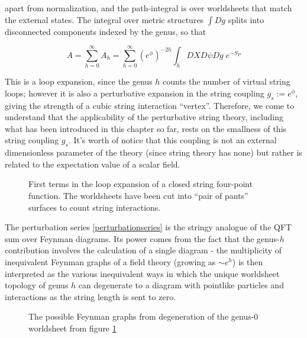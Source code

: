 apart from normalization, and the path-integral is over worldsheets that match the external states. The integral over metric structures $\int Dg$ splits into disconnected components indexed by the genus, so that

\begin{equation}
	A = \sum_{h=0}^{\infty} A_h = \sum_{h=0}^\infty (e^\phi)^{-2h} \int_h DX D\psi Dg \; e^{-S_P}
	\label{perturbationseries}
\end{equation}

This is a loop expansion, since the genus $h$ counts the number of virtual string loops; however it is also a perturbative expansion in the string coupling $g_s := e^\phi$, giving the strength of a cubic string interaction ``vertex''. Therefore, we come to understand that the applicability of the perturbative string theory, including what has been introduced in this chapter so far, rests on the smallness of this string coupling $g_s$. It's worth of notice that this coupling is not an external dimensionless parameter of the theory (since string theory has none) but rather is related to the expectation value of a scalar field.

\begin{figure}[h!]
\centering
\def\svgwidth{300pt}
\captionsetup{width=0.8\textwidth}

\caption{First terms in the loop expansion of a closed string four-point function. The worldsheets have been cut into ``pair of pants'' surfaces to count string interactions.} \label{loopfigure}
\end{figure}


The perturbation series \eqref{perturbationseries} is the stringy analogue of the QFT sum over Feynman diagrams. Its power comes from the fact that the genus-$h$ contribution involves the calculation of a single diagram - the multiplicity of inequivalent Feynman graphs of a field theory (growing as $\sim e^h$) is then interpreted as the various inequivalent ways in which the unique worldsheet topology of genus $h$ can degenerate to a diagram with pointlike particles and interactions as the string length is sent to zero.


\begin{figure}[h!]
\centering
\def\svgwidth{300pt}
\captionsetup{width=0.8\textwidth}

\caption{The possible Feynman graphs from degeneration of the genus-$0$ worldsheet from figure \ref{loopfigure}}
\end{figure}



